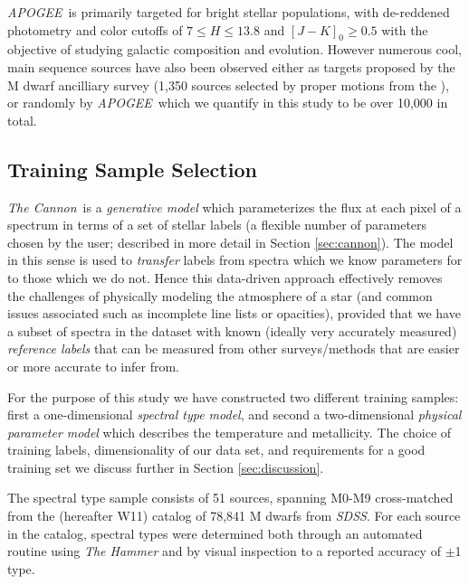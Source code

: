 \documentclass[modern]{aastex62}
\newcommand{\apogee}{\textsl{APOGEE}}
\newcommand{\thecannon}{\textsl{The Cannon}}
\newcommand{\sdss}{\textsl{SDSS}}
\begin{document}
\apogee\ is primarily targeted for bright stellar populations, with de-reddened photometry and color cutoffs of $7 \leq H \leq 13.8$ and $[J-K]_0 \geq 0.5$ \citep{Zasowski:2013} with the objective of studying galactic composition and evolution. However numerous cool, main sequence sources have also been observed either as targets proposed by the M dwarf ancilliary survey (1,350 sources selected by proper motions from the  \citealt{Desphande:2013}), or randomly by \apogee\, which we quantify in this study to be over 10,000 in total.

\subsection{Training Sample Selection}

\thecannon\ is a \emph{generative model} which parameterizes the flux at each pixel of a spectrum in terms of a set of stellar labels (a flexible number of parameters chosen by the user; described in more detail in Section \ref{sec:cannon}). The model in this sense is used to \emph{transfer} labels from spectra which we know parameters for to those which we do not. Hence this data-driven approach effectively removes the challenges of physically modeling the atmosphere of a star (and common issues associated such as incomplete line lists or opacities), provided that we have a subset of spectra in the dataset with known (ideally very accurately measured) \emph{reference labels} that can be measured from other surveys/methods that are easier or more accurate to infer from. 

For the purpose of this study we have constructed two different training samples: first a one-dimensional \emph{spectral type model}, and second a two-dimensional \emph{physical parameter model} which describes the temperature and metallicity. The choice of training labels, dimensionality of our data set, and requirements for a good training set we discuss further in Section \ref{sec:discussion}.

The spectral type sample consists of 51 sources, spanning M0-M9 cross-matched from the \citealt{West:2011} (hereafter W11) catalog of 78,841 M dwarfs from \sdss. For each source in the catalog, spectral types were determined both through an automated routine using \textsl{The Hammer} \citep{Covey:2007} and by visual inspection to a reported accuracy of $\pm$1 type.
\end{document}
